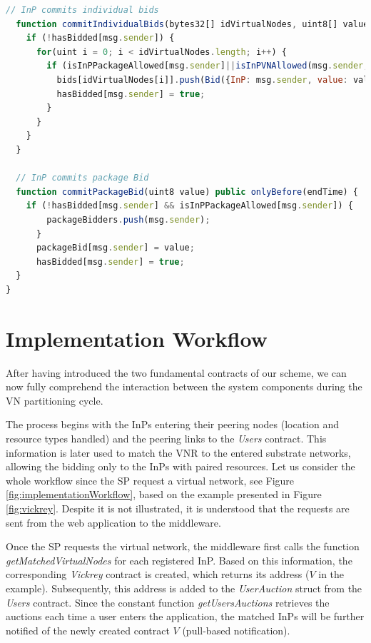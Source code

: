 \begin{lstlisting}[language=JavaScript]
  // InP commits individual bids
  function commitIndividualBids(bytes32[] idVirtualNodes, uint8[] values) public onlyBefore(endTime) {
    if (!hasBidded[msg.sender]) {
      for(uint i = 0; i < idVirtualNodes.length; i++) {
        if (isInPPackageAllowed[msg.sender]||isInPVNAllowed(msg.sender,idVirtualNodes[i])) {
          bids[idVirtualNodes[i]].push(Bid({InP: msg.sender, value: values[i]}));
          hasBidded[msg.sender] = true;
        }
      }
    }
  }

  // InP commits package Bid
  function commitPackageBid(uint8 value) public onlyBefore(endTime) {
    if (!hasBidded[msg.sender] && isInPPackageAllowed[msg.sender]) {
        packageBidders.push(msg.sender);
      }
      packageBid[msg.sender] = value;
      hasBidded[msg.sender] = true;
  }
}
\end{lstlisting}

\section{Implementation Workflow}

After having introduced the two fundamental contracts of our scheme, we can now fully comprehend the interaction between the system components during the VN partitioning cycle.
 
The process begins with the InPs entering their peering nodes (location and resource types handled) and the peering links to the \textit{Users} contract. This information is later used to match the VNR to the entered substrate networks, allowing the bidding only to the InPs with paired resources. Let us consider the whole workflow since the SP request a virtual network, see Figure \ref{fig:implementationWorkflow}, based on the example presented in Figure \ref{fig:vickrey}. Despite it is not illustrated, it is understood that the requests are sent from the web application to the middleware.

Once the SP requests the virtual network, the middleware first calls the function \textit{getMatchedVirtualNodes} for each registered InP. Based on this information, the corresponding \textit{Vickrey} contract is created, which returns its address ($V$ in the example). Subsequently, this address is added to the \textit{UserAuction} struct from the \textit{Users} contract. Since the constant function \textit{getUsersAuctions} retrieves the auctions each time a user enters the application, the matched InPs will be further notified of the newly created contract $V$ (pull-based notification).

